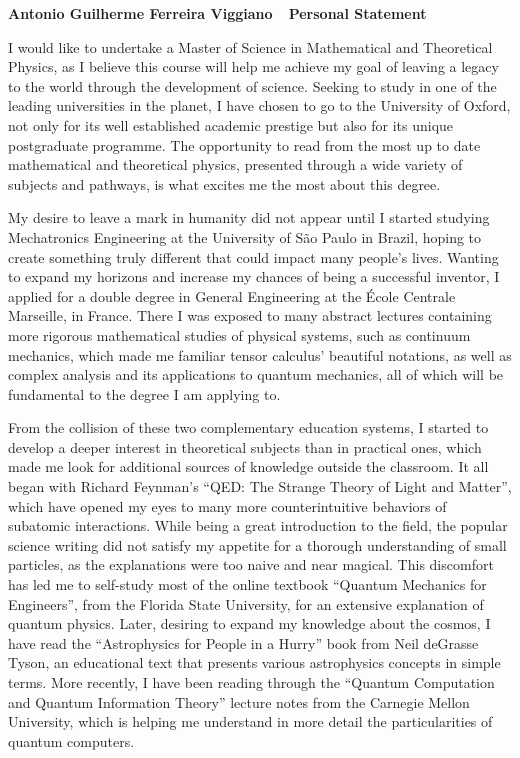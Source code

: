 \documentclass[10pt]{article}
\def\firstname{Antonio Guilherme }
\def\familyname{Ferreira Viggiano}
\def\subj{Personal Statement}
\def\FileTitle{\firstname\familyname~\textemdash~\subj}
\begin{document}
\sffamily %

{\bfseries \FileTitle}

I would like to undertake a Master of Science in Mathematical and Theoretical Physics, as I believe this course will help me achieve my goal of leaving a legacy to the world through the development of science. Seeking to study in one of the leading universities in the planet, I have chosen to go to the University of Oxford, not only for its well established academic prestige but also for its unique postgraduate programme. The opportunity to read from the most up to date mathematical and theoretical physics, presented through a wide variety of subjects and pathways, is what excites me the most about this degree.

My desire to leave a mark in humanity did not appear until I started studying Mechatronics Engineering at the University of São Paulo in Brazil, hoping to create something truly different that could impact many people's lives. Wanting to expand my horizons and increase my chances of being a successful inventor, I applied for a double degree in General Engineering at the École Centrale Marseille, in France. There I was exposed to many abstract lectures containing more rigorous mathematical studies of physical systems, such as continuum mechanics, which made me familiar tensor calculus' beautiful notations, as well as complex analysis and its applications to quantum mechanics, all of which will be fundamental to the degree I am applying to.

From the collision of these two complementary education systems, I started to develop a deeper interest in theoretical subjects than in practical ones, which made me look for additional sources of knowledge outside the classroom. It all began with Richard Feynman's ``QED: The Strange Theory of Light and Matter'', which have opened my eyes to many more counterintuitive behaviors of subatomic interactions. While being a great introduction to the field, the popular science writing did not satisfy my appetite for a thorough understanding of small particles, as the explanations were too naive and near magical. This discomfort has led me to self-study most of the online textbook ``Quantum Mechanics for Engineers'', from the Florida State University, for an extensive explanation of quantum physics. Later, desiring to expand my knowledge about the cosmos, I have read the ``Astrophysics for People in a Hurry'' book from Neil deGrasse Tyson, an educational text that presents various astrophysics concepts in simple terms. More recently, I have been reading through the ``Quantum Computation and Quantum Information Theory'' lecture notes from the Carnegie Mellon University, which is helping me understand in more detail the particularities of quantum computers.
\end{document}
